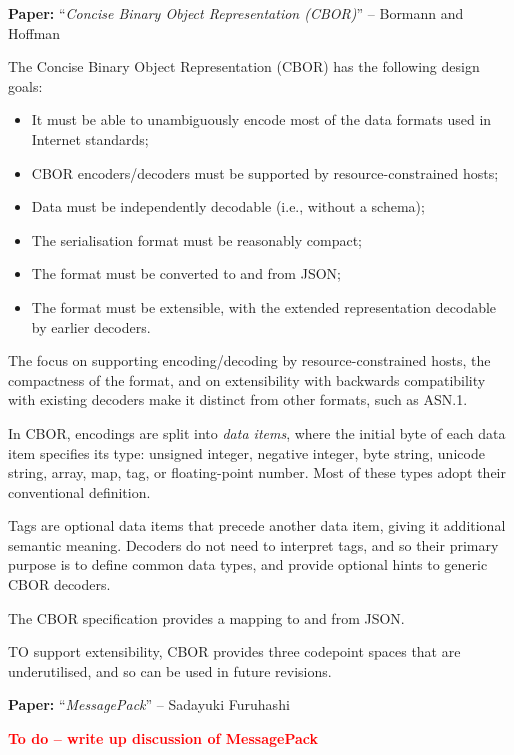 \documentclass[10pt,a4paper]{article}
\newcommand{\todo}[1]{\textbf{\textcolor{red}{To do -- #1}}}
\newcommand{\paper}[3]{\vspace{4mm}\noindent\textbf{Paper:} ``\textit{#1}'' -- #2 \cite{#3}\vspace{3mm}}
\begin{document}
\paper{Concise Binary Object Representation (CBOR)}{Bormann and Hoffman}{rfc7049}

The Concise Binary Object Representation (CBOR) has the following design goals:
\begin{itemize}
	\item It must be able to unambiguously encode most of the data formats used in Internet
	      standards;
	\item CBOR encoders/decoders must be supported by resource-constrained hosts;
	\item Data must be independently decodable (i.e., without a schema);
	\item The serialisation format must be reasonably compact;
	\item The format must be converted to and from JSON;
	\item The format must be extensible, with the extended representation decodable by
	      earlier decoders.
\end{itemize}
    
The focus on supporting encoding/decoding by resource-constrained hosts, the compactness 
of the format, and on extensibility with backwards compatibility with existing decoders
make it distinct from other formats, such as ASN.1.

In CBOR, encodings are split into \emph{data items}, where the initial byte of each data
item specifies its type: unsigned integer, negative integer, byte string, unicode string,
array, map, tag, or floating-point number. Most of these types adopt their conventional
definition. 

Tags are optional data items that precede another data item, giving it additional semantic
meaning. Decoders do not need to interpret tags, and so their primary purpose is to define
common data types, and provide optional hints to generic CBOR decoders. 

The CBOR specification provides a mapping to and from JSON.

TO support extensibility, CBOR provides three codepoint spaces that are underutilised, and
so can be used in future revisions.

\paper{MessagePack}{Sadayuki Furuhashi}{msgpack}

\todo{write up discussion of MessagePack}
\end{document}
